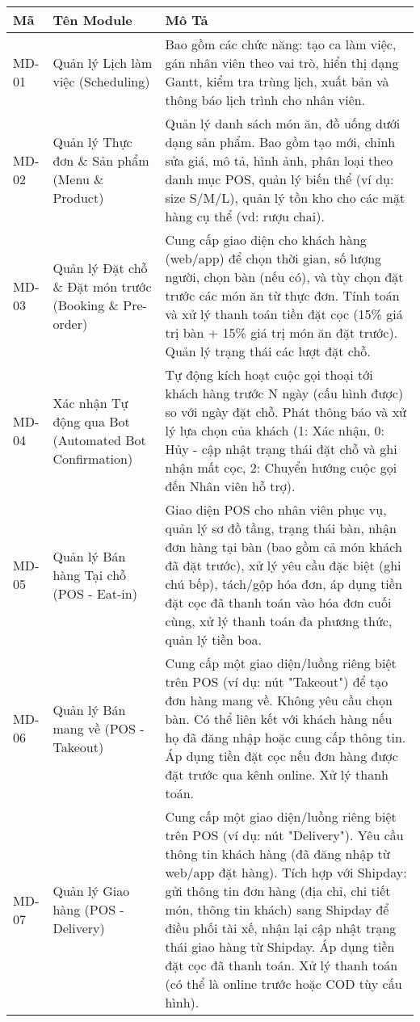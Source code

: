 \begin{longtable}{|m{1.5cm}|m{4.5cm}|m{9cm}|}
\hline
\textbf{Mã} & \textbf{Tên Module} & \textbf{Mô Tả} \\
\hline
\endhead %

\hline
\endfoot %

\hline
\endlastfoot %

MD-01 & Quản lý Lịch làm việc (Scheduling) & Bao gồm các chức năng: tạo ca làm việc, gán nhân viên theo vai trò, hiển thị dạng Gantt, kiểm tra trùng lịch, xuất bản và thông báo lịch trình cho nhân viên. \\
\hline
MD-02 & Quản lý Thực đơn \& Sản phẩm (Menu \& Product) & Quản lý danh sách món ăn, đồ uống dưới dạng sản phẩm. Bao gồm tạo mới, chỉnh sửa giá, mô tả, hình ảnh, phân loại theo danh mục POS, quản lý biến thể (ví dụ: size S/M/L), quản lý tồn kho cho các mặt hàng cụ thể (vd: rượu chai). \\
\hline
MD-03 & Quản lý Đặt chỗ \& Đặt món trước (Booking \& Pre-order) & Cung cấp giao diện cho khách hàng (web/app) để chọn thời gian, số lượng người, chọn bàn (nếu có), và tùy chọn đặt trước các món ăn từ thực đơn. Tính toán và xử lý thanh toán tiền đặt cọc (15\% giá trị bàn + 15\% giá trị món ăn đặt trước). Quản lý trạng thái các lượt đặt chỗ. \\
\hline
MD-04 & Xác nhận Tự động qua Bot (Automated Bot Confirmation) & Tự động kích hoạt cuộc gọi thoại tới khách hàng trước N ngày (cấu hình được) so với ngày đặt chỗ. Phát thông báo và xử lý lựa chọn của khách (1: Xác nhận, 0: Hủy - cập nhật trạng thái đặt chỗ và ghi nhận mất cọc, 2: Chuyển hướng cuộc gọi đến Nhân viên hỗ trợ). \\
\hline
MD-05 & Quản lý Bán hàng Tại chỗ (POS - Eat-in) & Giao diện POS cho nhân viên phục vụ, quản lý sơ đồ tầng, trạng thái bàn, nhận đơn hàng tại bàn (bao gồm cả món khách đã đặt trước), xử lý yêu cầu đặc biệt (ghi chú bếp), tách/gộp hóa đơn, áp dụng tiền đặt cọc đã thanh toán vào hóa đơn cuối cùng, xử lý thanh toán đa phương thức, quản lý tiền boa. \\
\hline
MD-06 & Quản lý Bán mang về (POS - Takeout) & Cung cấp một giao diện/luồng riêng biệt trên POS (ví dụ: nút "Takeout") để tạo đơn hàng mang về. Không yêu cầu chọn bàn. Có thể liên kết với khách hàng nếu họ đã đăng nhập hoặc cung cấp thông tin. Áp dụng tiền đặt cọc nếu đơn hàng được đặt trước qua kênh online. Xử lý thanh toán. \\
\hline
MD-07 & Quản lý Giao hàng (POS - Delivery) & Cung cấp một giao diện/luồng riêng biệt trên POS (ví dụ: nút "Delivery"). Yêu cầu thông tin khách hàng (đã đăng nhập từ web/app đặt hàng). Tích hợp với Shipday: gửi thông tin đơn hàng (địa chỉ, chi tiết món, thông tin khách) sang Shipday để điều phối tài xế, nhận lại cập nhật trạng thái giao hàng từ Shipday. Áp dụng tiền đặt cọc đã thanh toán. Xử lý thanh toán (có thể là online trước hoặc COD tùy cấu hình). \\

\end{longtable}
